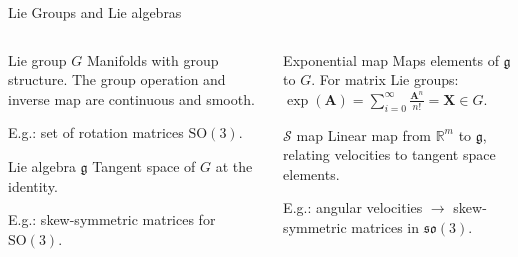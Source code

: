 \begin{frame}{Lie Groups and Lie algebras}
    \begin{columns}[c]
        \begin{column}{0.5\linewidth}
            \begin{exampleblock}{Lie group $G$}
                Manifolds with group structure. The group operation and inverse map are continuous and smooth.
                \linebreak

                E.g.: set of rotation matrices $\text{SO}(3)$.
            \end{exampleblock}
            \begin{exampleblock}{Lie algebra $\mathfrak{g}$}
                Tangent space of $G$ at the identity.
                \linebreak

                E.g.: skew-symmetric matrices for $\text{SO}(3)$.
            \end{exampleblock}
        \end{column}
        \begin{column}{0.5\linewidth}
            \begin{exampleblock}{Exponential map}
                Maps elements of $\mathfrak{g}$ to $G$. For matrix Lie groups: $\exp(\mathbf{A})=\sum_{i=0}^\infty \frac{\mathbf{A}^n}{n!} = \mathbf{X} \in G$.
            \end{exampleblock}
            \begin{exampleblock}{$\mathcal{S}$ map}
                Linear map from $\mathbb{R}^m$ to $\mathfrak{g}$, relating velocities to tangent space elements.
                \linebreak

                E.g.: angular velocities $\to$ skew-symmetric matrices in $\mathfrak{so}(3)$.
            \end{exampleblock}    
        \end{column}
    \end{columns}
\end{frame}
